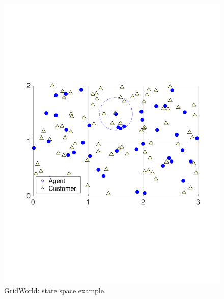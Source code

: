 \documentclass[journal]{IEEEtran}
\begin{document}
\begin{figure}
    \centering
    \includegraphics[scale = 0.4, trim={1cm 7.5cm 1cm 7.5cm}, clip]{state_space_3x2.pdf}
    \caption{GridWorld: state space example.}
    \label{fig:state_space_c2}
\end{figure}
\end{document}
